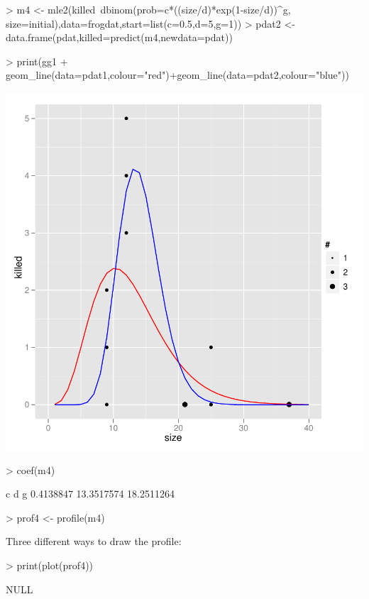 \documentclass{article}
\begin{document}
\begin{Schunk}
\begin{Sinput}
> m4 <- mle2(killed~dbinom(prob=c*((size/d)*exp(1-size/d))^g,
   size=initial),data=frogdat,start=list(c=0.5,d=5,g=1))
> pdat2 <- data.frame(pdat,killed=predict(m4,newdata=pdat))
\end{Sinput}
\end{Schunk}

\begin{Schunk}
\begin{Sinput}
> print(gg1 + geom_line(data=pdat1,colour="red")+geom_line(data=pdat2,colour="blue"))
\end{Sinput}
\end{Schunk}
\includegraphics{mle2-039}

\begin{Schunk}
\begin{Sinput}
> coef(m4)
\end{Sinput}
\begin{Soutput}
         c          d          g 
 0.4138847 13.3517574 18.2511264 
\end{Soutput}
\begin{Sinput}
> prof4 <- profile(m4)
\end{Sinput}
\end{Schunk}

Three different ways to draw the profile:
\begin{Schunk}
\begin{Sinput}
> print(plot(prof4))
\end{Sinput}
\begin{Soutput}
NULL
\end{Soutput}
\end{Schunk}
\end{document}
